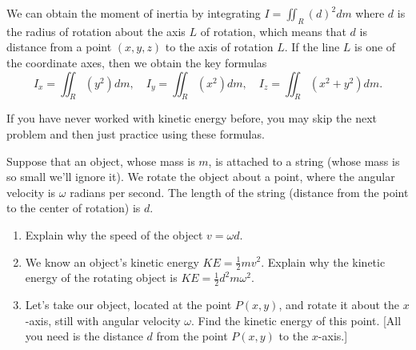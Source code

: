 {\begin{definition}
We can obtain the moment of inertia by integrating $I=\iint_R (d)^2 dm$ where $d$ is the radius of rotation about the axis $L$ of rotation, which means that $d$  is distance from a point $(x,y,z)$ to the axis of rotation $L$. If the line $L$ is one of the coordinate axes, then we obtain the key formulas 
$$
I_x = \iint_R (y^2)dm,\quad
I_y = \iint_R (x^2)dm,\quad
I_z = \iint_R (x^2+y^2)dm
.$$
\end{definition}

If you have never worked with kinetic energy before, you may skip the next problem and then just practice using these formulas.



\begin{problem}
%
%
 Suppose that an object, whose mass is $m$, is attached to a string (whose mass is so small we'll ignore it). We rotate the object about a point, where the angular velocity is $\omega$ radians per second. The length of the string (distance from the point to the center of rotation) is $d$.
 \begin{enumerate}
 \item Explain why the speed of the object $v=\omega d$.  
 \item We know an object's kinetic energy $KE=\frac{1}{2}mv^2$. 
Explain why the kinetic energy of the rotating object is $KE = \frac{1}{2}d^2m\omega^2$. 
  \item Let's take our object, located at the point $P(x,y)$, and rotate it about the $x$-axis, still with angular velocity $\omega$. Find the kinetic energy of this point. [All you need is the distance $d$ from the point $P(x,y)$ to the $x$-axis.]

\end{enumerate}
\end{problem}}
